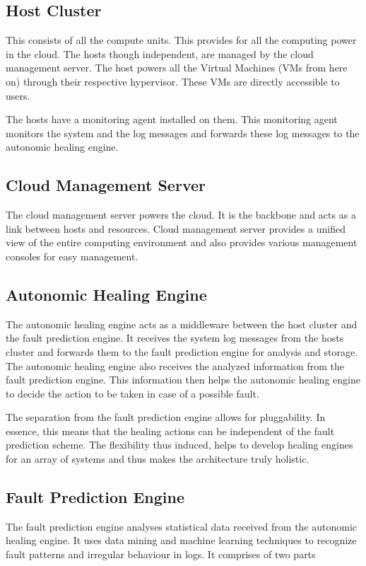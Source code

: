\subsection{Host Cluster}
This consists of all the compute units. This provides for all the computing power in the cloud. The hosts though independent, are managed by the cloud management server. The host powers all the Virtual Machines (VMs from here on) through their respective hypervisor. These VMs are directly accessible to users.

The hosts have a monitoring agent installed on them. This monitoring agent monitors the system and the log messages and forwards these log messages to the autonomic healing engine.
\subsection{Cloud Management Server}
The cloud management server powers the cloud. It is the backbone and acts as a link between hosts and resources. Cloud management server provides a unified view of the entire computing environment and also provides various management consoles for easy management.
\subsection{Autonomic Healing Engine}
The autonomic healing engine acts as a middleware between the host cluster and the fault prediction engine. It receives the system log messages from the hosts cluster and forwards them to the fault prediction engine for analysis and storage. The autonomic healing engine also receives the analyzed information from the fault prediction engine. This information then helps the autonomic healing engine to decide the action to be taken in case of a possible fault.

The separation from the fault prediction engine allows for pluggability. In essence, this means that the healing actions can be independent of the fault prediction scheme. The flexibility thus induced, helps to develop healing engines for an array of systems and thus makes the architecture truly holistic.
\subsection{Fault Prediction Engine}
The fault prediction engine analyses statistical data received from the autonomic healing engine. It uses data mining and machine learning techniques to recognize fault patterns and irregular behaviour in logs. It comprises of two parts
